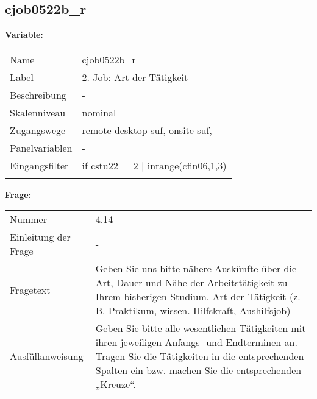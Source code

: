 	
	
	\subsection{cjob0522b\_r}
	\label{subSection:cjob0522b_r}

	\noindent\textbf{Variable:}\\
		\begin{tabular}{lL{11.3cm}}
			\label{tableVariable:cjob0522b_r}
			Name & cjob0522b\_r \\
			Label & 2. Job: Art der Tätigkeit \\
			Beschreibung & - \\
			Skalenniveau & nominal \\
			Zugangswege &
				remote-desktop-suf,
				onsite-suf,
 \\
			Panelvariablen & -
			 \\
			Eingangsfilter & if cstu22==2 | inrange(cfin06,1,3) \\
 \\
		\end{tabular}

		\vspace*{1 cm}
		\noindent\textbf{Frage:}\\
		\begin{tabular}{lL{11.3cm}}
			\label{tableQuestion:cjob0522b_r}
			Nummer & 4.14 \\
			Einleitung der Frage & - \\
			Fragetext & Geben Sie uns bitte nähere Auskünfte über die Art, Dauer und Nähe der Arbeitstätigkeit zu Ihrem bisherigen Studium.
Art der Tätigkeit
(z. B. Praktikum, wissen. Hilfskraft, Aushilfsjob) \\
			Ausfüllanweisung & Geben Sie bitte alle wesentlichen Tätigkeiten mit ihren jeweiligen Anfangs- und Endterminen an. Tragen Sie die Tätigkeiten in die entsprechenden Spalten ein bzw. machen Sie die entsprechenden „Kreuze“. \\
		\end{tabular}





